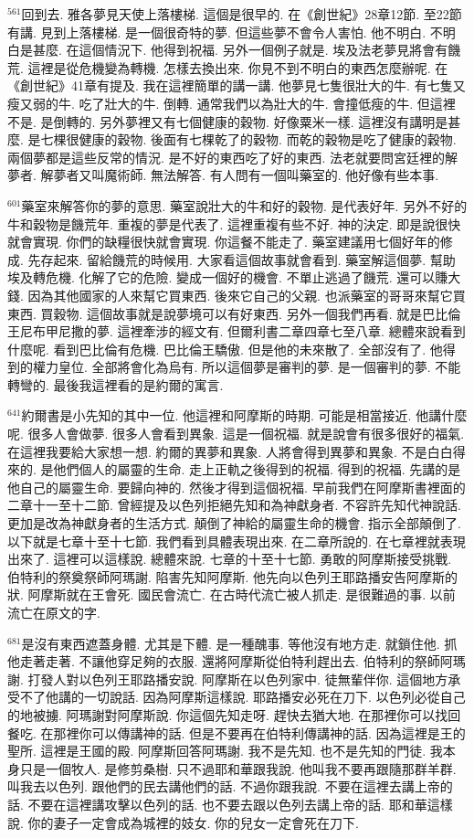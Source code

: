 \documentclass{book}
\begin{document}
$^{561}$回到去.
雅各夢見天使上落樓梯.
這個是很早的.
在《創世紀》28章12節.
至22節有講.
見到上落樓梯.
是一個很奇特的夢.
但這些夢不會令人害怕.
他不明白.
不明白是甚麼.
在這個情況下.
他得到祝福.
另外一個例子就是.
埃及法老夢見將會有饑荒.
這裡是從危機變為轉機.
怎樣去換出來.
你見不到不明白的東西怎麼辦呢.
在《創世紀》41章有提及.
我在這裡簡單的講一講.
他夢見七隻很壯大的牛.
有七隻又瘦又弱的牛.
吃了壯大的牛.
倒轉.
通常我們以為壯大的牛.
會撞低瘦的牛.
但這裡不是.
是倒轉的.
另外夢裡又有七個健康的穀物.
好像粟米一樣.
這裡沒有講明是甚麼.
是七棵很健康的穀物.
後面有七棵乾了的穀物.
而乾的穀物是吃了健康的穀物.
兩個夢都是這些反常的情況.
是不好的東西吃了好的東西.
法老就要問宮廷裡的解夢者.
解夢者又叫魔術師.
無法解答.
有人問有一個叫藥室的.
他好像有些本事.

$^{601}$藥室來解答你的夢的意思.
藥室說壯大的牛和好的穀物.
是代表好年.
另外不好的牛和穀物是饑荒年.
重複的夢是代表了.
這裡重複有些不好.
神的決定.
即是說很快就會實現.
你們的缺糧很快就會實現.
你這餐不能走了.
藥室建議用七個好年的修成.
先存起來.
留給饑荒的時候用.
大家看這個故事就會看到.
藥室解這個夢.
幫助埃及轉危機.
化解了它的危險.
變成一個好的機會.
不單止逃過了饑荒.
還可以賺大錢.
因為其他國家的人來幫它買東西.
後來它自己的父親.
也派藥室的哥哥來幫它買東西.
買穀物.
這個故事就是說夢境可以有好東西.
另外一個我們再看.
就是巴比倫王尼布甲尼撒的夢.
這裡牽涉的經文有.
但爾利書二章四章七至八章.
總體來說看到什麼呢.
看到巴比倫有危機.
巴比倫王驕傲.
但是他的未來散了.
全部沒有了.
他得到的權力皇位.
全部將會化為烏有.
所以這個夢是審判的夢.
是一個審判的夢.
不能轉彎的.
最後我這裡看的是約爾的寓言.

$^{641}$約爾書是小先知的其中一位.
他這裡和阿摩斯的時期.
可能是相當接近.
他講什麼呢.
很多人會做夢.
很多人會看到異象.
這是一個祝福.
就是說會有很多很好的福氣.
在這裡我要給大家想一想.
約爾的異夢和異象.
人將會得到異夢和異象.
不是白白得來的.
是他們個人的屬靈的生命.
走上正軌之後得到的祝福.
得到的祝福.
先講的是他自己的屬靈生命.
要歸向神的.
然後才得到這個祝福.
早前我們在阿摩斯書裡面的二章十一至十二節.
曾經提及以色列拒絕先知和為神獻身者.
不容許先知代神說話.
更加是改為神獻身者的生活方式.
顛倒了神給的屬靈生命的機會.
指示全部顛倒了.
以下就是七章十至十七節.
我們看到具體表現出來.
在二章所說的.
在七章裡就表現出來了.
這裡可以這樣說.
總體來說.
七章的十至十七節.
勇敢的阿摩斯接受挑戰.
伯特利的祭奠祭師阿瑪謝.
陷害先知阿摩斯.
他先向以色列王耶路播安告阿摩斯的狀.
阿摩斯就在王會死.
國民會流亡.
在古時代流亡被人抓走.
是很難過的事.
以前流亡在原文的字.

$^{681}$是沒有東西遮蓋身體.
尤其是下體.
是一種醜事.
等他沒有地方走.
就鎖住他.
抓他走著走著.
不讓他穿足夠的衣服.
還將阿摩斯從伯特利趕出去.
伯特利的祭師阿瑪謝.
打發人對以色列王耶路播安說.
阿摩斯在以色列家中.
徒無輩伴你.
這個地方承受不了他講的一切說話.
因為阿摩斯這樣說.
耶路播安必死在刀下.
以色列必從自己的地被擄.
阿瑪謝對阿摩斯說.
你這個先知走呀.
趕快去猶大地.
在那裡你可以找回餐吃.
在那裡你可以傳講神的話.
但是不要再在伯特利傳講神的話.
因為這裡是王的聖所.
這裡是王國的殿.
阿摩斯回答阿瑪謝.
我不是先知.
也不是先知的門徒.
我本身只是一個牧人.
是修剪桑樹.
只不過耶和華跟我說.
他叫我不要再跟隨那群羊群.
叫我去以色列.
跟他們的民去講他們的話.
不過你跟我說.
不要在這裡去講上帝的話.
不要在這裡講攻擊以色列的話.
也不要去跟以色列去講上帝的話.
耶和華這樣說.
你的妻子一定會成為城裡的妓女.
你的兒女一定會死在刀下.
\end{document}
